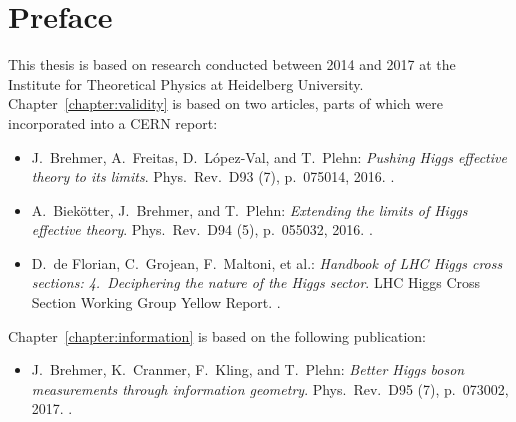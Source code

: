 
\chapter*{Preface}
\label{chapter:preface}

This thesis is based on research conducted between 2014 and 2017 at
the Institute for Theoretical Physics at Heidelberg
University. Chapter~\ref{chapter:validity} is based on two articles,
parts of which were incorporated into a CERN report:
% 
\begin{itemize}
  \item[\cite{Brehmer:2015rna}] J.~Brehmer, A.~Freitas, D.~L\'opez-Val, and T.~Plehn:\newline
	\emph{Pushing Higgs effective theory to its limits}.\newline
	Phys.~Rev.~D93 (7), p.~075014, 2016. .
  \item[\cite{Biekotter:2016ecg}] A.~Biek\"otter, J.~Brehmer, and T.~Plehn:\newline
	\emph{Extending the limits of Higgs effective theory}.\newline
	Phys.~Rev.~D94 (5), p.~055032, 2016. . 
  \item[\cite{deFlorian:2016spz}] D.~de Florian, C.~Grojean, F.~Maltoni, et al.:\newline
        \emph{Handbook of LHC Higgs cross sections: 4.~Deciphering the nature of the Higgs sector}.\newline
        LHC Higgs Cross Section Working Group Yellow Report. .
\end{itemize}
%
Chapter~\ref{chapter:information} is based on the following publication:
%
\begin{itemize}
  \item[\cite{Brehmer:2016nyr}] J.~Brehmer, K.~Cranmer, F.~Kling, and T.~Plehn:\newline
	\emph{Better Higgs boson measurements through information geometry}.\newline
       Phys.~Rev.~D95 (7), p.~073002, 2017. .
\end{itemize}
%
